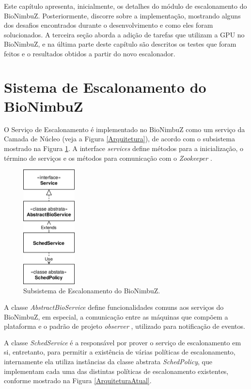 
Este capítulo apresenta, inicialmente, os detalhes do módulo de escalonamento do BioNimbuZ. Posteriormente, discorre sobre a implementação, mostrando alguns dos desafios encontrados durante o desenvolvimento e como eles foram solucionados. A terceira seção aborda a adição de tarefas que utilizam a \acrshort{GPU} no BioNimbuZ, e na última parte deste capítulo são descritos os testes que foram feitos e o resultados obtidos a partir do novo escalonador.

\section{Sistema de Escalonamento do BioNimbuZ}

O Serviço de Escalonamento é implementado no BioNimbuZ como um serviço da Camada de Núcleo (veja a Figura \ref{Arquitetura}), de acordo com o subsistema mostrado na Figura \ref{SubsistemaDeEscalonamento}. A interface \textit{services} define métodos para a inicialização, o término de serviços e os métodos para comunicação com o \textit{Zookeeper} \cite{Zookeeper}. 
\begin{figure}[htbp]
	\centerline{\includegraphics[width=2.8cm]{img/SubsistemaDeEscalonamento.png}}
	\caption{Subsistema de Escalonamento do BioNimbuZ.}
	\label{SubsistemaDeEscalonamento}
\end{figure}
A classe \textit{AbstractBioService} define funcionalidades comuns aos serviços do BioNimbuZ, em especial, a comunicação entre as máquinas que compõem a plataforma e o padrão de projeto \textit{observer} \cite{PadroesDeProjeto}, utilizado para notificação de eventos.

A classe \textit{SchedService} é a responsável por prover o serviço de escalonamento em si, entretanto, para permitir a existência de várias políticas de escalonamento, internamente ela utiliza instâncias da classe abstrata \textit{SchedPolicy}, que implementam cada uma das distintas políticas de escalonamento existentes, conforme mostrado na Figura \ref{ArquiteturaAtual}.

